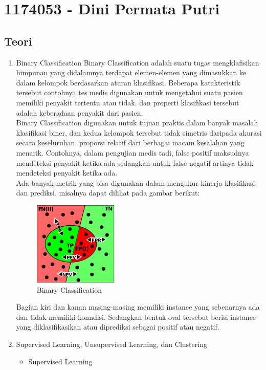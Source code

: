 \section{1174053 - Dini Permata Putri}
\subsection{Teori}
\begin{enumerate}
\item Binary Classification
\hfill\break
Binary Classification adalah suatu tugas mengklafisikan himpunan yang didalamnya terdapat elemen-elemen yang dimasukkan ke dalam kelompok berdasarkan aturan klasifikasi. Beberapa katakteristik tersebut contohnya tes medis digunakan untuk mengetahui suatu pasien memiliki penyakit tertentu atau tidak. dan properti klasifikasi tersebut adalah keberadaan penyakit dari pasien.\\
Binary Classification digunakan untuk tujuan praktis dalam banyak masalah klasifikasi biner, dan kedua kelompok tersebut tidak simetris daripada akurasi secara keseluruhan, proporsi relatif dari berbagai macam kesalahan yang menarik. Contohnya, dalam pengujian medis tadi, false positif maksudnya mendeteksi penyakit ketika ada sedangkan untuk false negatif artinya tidak mendeteksi penyakit ketika ada.\\
Ada banyak metrik yang bisa digunakan dalam mengukur kinerja klasifikasi dan prediksi. misalnya dapat dilihat pada gambar berikut:
	\begin{figure}[H]
		\includegraphics[width=4cm]{figures/1174053/2/binary.png}
		\centering
		\caption{Binary Classification}
	\end{figure}
Bagian kiri dan kanan masing-masing memiliki instance yang sebenarnya ada dan tidak memiliki konndisi. Sedangkan bentuk oval tersebut berisi instance yang diklasifikasikan atau diprediksi sebagai positif atau negatif.
\item Supervised Learning, Unsupervised Learning, dan Clustering
\hfill\break
	\begin{itemize}
	\item Supervised Learning \\

\end{itemize}
\end{enumerate}
